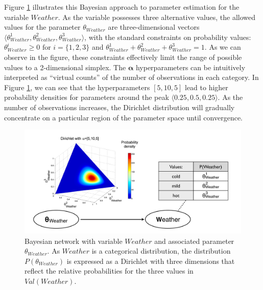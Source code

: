 Figure \ref{fig:baysianlearning} illustrates this Bayesian approach to parameter estimation for the variable $\mathit{Weather}$.  As the variable possesses three alternative values, the allowed values for the parameter $\theta_{\mathit{Weather}}$ are three-dimensional vectors $\langle \theta_{\mathit{Weather}}^1, \theta_{\mathit{Weather}}^2, \theta_{\mathit{Weather}}^3 \rangle$, with the standard constraints on probability values: $\theta_{\mathit{Weather}}^i \geq 0 \text{ for } i=\{1,2,3\} $ and $\theta_{\mathit{Weather}}^1 + \theta_{\mathit{Weather}}^2 + \theta_{\mathit{Weather}}^3 = 1$.   As we can observe in the figure, these constraints effectively limit the range of possible values to a 2-dimensional simplex. The $\boldsymbol\alpha$ hyperparameters can be intuitively interpreted as ``virtual counts'' of the number of observations in each category.   In Figure \ref{fig:baysianlearning}, we can see that the hyperparameters $[5,10,5]$ lead to higher probability densities for parameters around the peak $\langle 0.25, 0.5, 0.25 \rangle$.  As the number of observations increases, the Dirichlet distribution will gradually concentrate on a particular region of the parameter space until convergence.


\begin{figure}[h]
\centering
\includegraphics[scale=0.28]{imgs/bayesianlearning.pdf}
\caption{Bayesian network with variable $\mathit{Weather}$ and associated parameter $\theta_{Weather}$.  As $\mathit{Weather}$ is a categorical distribution, the distribution $P(\theta_{Weather})$ is expressed as a Dirichlet with three dimensions that reflect the relative probabilities for the three values in $Val(\mathit{Weather})$. }
\label{fig:baysianlearning}
\end{figure}

